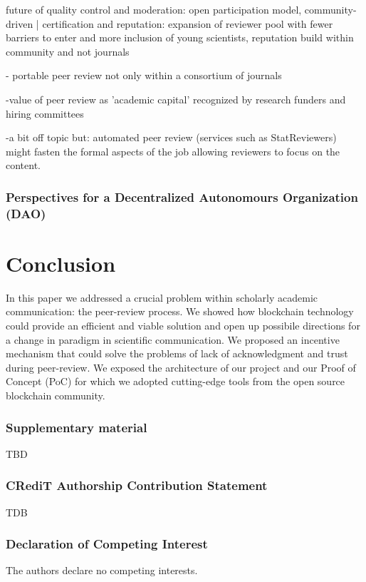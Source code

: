 \documentclass[runningheads]{llncs}
\begin{document}
future of quality control and moderation: open participation model, community-driven | certification and reputation: expansion of reviewer pool with fewer barriers to enter and more inclusion of young scientists, reputation build within community and not journals

- portable peer review not only within a consortium of journals

-value of peer review as 'academic capital' recognized by research funders and hiring committees

-a bit off topic but: automated peer review (services such as StatReviewers) might fasten the formal aspects of the job allowing reviewers to focus on the content.

\subsubsection{Perspectives for a Decentralized Autonomours Organization (DAO)}

\section{Conclusion}
In this paper we addressed a crucial problem within scholarly academic communication: the peer-review process. We showed how blockchain technology could provide an efficient and viable solution and open up possibile directions for a change in paradigm in scientific communication. We proposed an incentive mechanism that could solve the problems of lack of acknowledgment and trust during peer-review. We exposed the architecture of our project and our Proof of Concept (PoC) for which we adopted cutting-edge tools from the open source blockchain community.

\subsubsection{Supplementary material}
TBD

\subsubsection{CRediT Authorship Contribution Statement}
TDB

\subsubsection{Declaration of Competing Interest}
The authors declare no competing interests.
\end{document}
